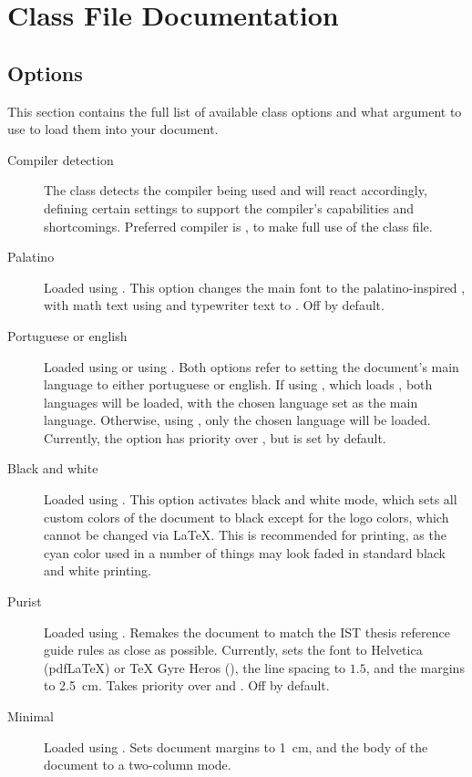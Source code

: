 \documentclass[palatino,english]{ist-report}
\begin{document}
\section{Class File Documentation}

\subsection{Options}\label{sec:options}

This section contains the full list of available class options and what argument to use to load them into your document.
\begin{description}
	\item [Compiler detection] The class detects the compiler being used and will react accordingly, defining certain settings to support the compiler's capabilities and shortcomings. Preferred compiler is \XeLaTeX{}, to make full use of the class file\footnotemark{}. 
	\item [Palatino] Loaded using . This option changes the main font to the palatino-inspired , with math text using  and typewriter text to . Off by default.
	\item [Portuguese or english] Loaded using  or using . Both options refer to setting the document's main language to either portuguese or english. If using \XeLaTeX{}, which loads , both languages will be loaded, with the chosen language set as the main language. Otherwise, using , only the chosen language will be loaded. Currently, the  option has priority over , but  is set by default.
	\item [Black and white] Loaded using . This option activates black and white mode, which sets all custom colors of the document to black except for the logo colors, which cannot be changed via \LaTeX{}. This is recommended for printing, as the cyan color used in a number of things may look faded in standard black and white printing.
	\item [Purist] Loaded using . Remakes the document to match the IST thesis reference guide rules as close as possible. Currently, sets the font to Helvetica (pdf\LaTeX{}) or \TeX{} Gyre Heros (\XeLaTeX{}), the line spacing to $1.5$, and the margins to \SI{2.5}{\centi\meter}. Takes priority over  and . Off by default.
	\item [Minimal] Loaded using . Sets document margins to \SI{1}{\centi\meter}, and the body of the document to a two-column mode.
\end{description}
\end{document}

